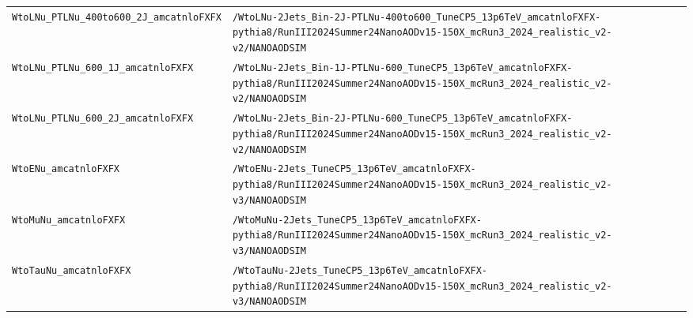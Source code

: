 \begin{longtable}{@{}>{\RaggedRight\arraybackslash}p{} >{\RaggedRight\arraybackslash}p{}@{}}
\addlinespace[2pt]
\texttt{WtoLNu\_\allowbreak{}PTLNu\_\allowbreak{}400to600\_\allowbreak{}2J\_\allowbreak{}amcatnloFXFX} & \texttt{/\allowbreak{}WtoLNu-\allowbreak{}2Jets\_\allowbreak{}Bin-\allowbreak{}2J-\allowbreak{}PTLNu-\allowbreak{}400to600\_\allowbreak{}TuneCP5\_\allowbreak{}13p6TeV\_\allowbreak{}amcatnloFXFX-\allowbreak{}pythia8/\allowbreak{}RunIII2024Summer24NanoAODv15-\allowbreak{}150X\_\allowbreak{}mcRun3\_\allowbreak{}2024\_\allowbreak{}realistic\_\allowbreak{}v2-\allowbreak{}v2/\allowbreak{}NANOAODSIM} \\
\addlinespace[2pt]
\texttt{WtoLNu\_\allowbreak{}PTLNu\_\allowbreak{}600\_\allowbreak{}1J\_\allowbreak{}amcatnloFXFX} & \texttt{/\allowbreak{}WtoLNu-\allowbreak{}2Jets\_\allowbreak{}Bin-\allowbreak{}1J-\allowbreak{}PTLNu-\allowbreak{}600\_\allowbreak{}TuneCP5\_\allowbreak{}13p6TeV\_\allowbreak{}amcatnloFXFX-\allowbreak{}pythia8/\allowbreak{}RunIII2024Summer24NanoAODv15-\allowbreak{}150X\_\allowbreak{}mcRun3\_\allowbreak{}2024\_\allowbreak{}realistic\_\allowbreak{}v2-\allowbreak{}v2/\allowbreak{}NANOAODSIM} \\
\addlinespace[2pt]
\texttt{WtoLNu\_\allowbreak{}PTLNu\_\allowbreak{}600\_\allowbreak{}2J\_\allowbreak{}amcatnloFXFX} & \texttt{/\allowbreak{}WtoLNu-\allowbreak{}2Jets\_\allowbreak{}Bin-\allowbreak{}2J-\allowbreak{}PTLNu-\allowbreak{}600\_\allowbreak{}TuneCP5\_\allowbreak{}13p6TeV\_\allowbreak{}amcatnloFXFX-\allowbreak{}pythia8/\allowbreak{}RunIII2024Summer24NanoAODv15-\allowbreak{}150X\_\allowbreak{}mcRun3\_\allowbreak{}2024\_\allowbreak{}realistic\_\allowbreak{}v2-\allowbreak{}v2/\allowbreak{}NANOAODSIM} \\
\addlinespace[2pt]
\texttt{WtoENu\_\allowbreak{}amcatnloFXFX} & \texttt{/\allowbreak{}WtoENu-\allowbreak{}2Jets\_\allowbreak{}TuneCP5\_\allowbreak{}13p6TeV\_\allowbreak{}amcatnloFXFX-\allowbreak{}pythia8/\allowbreak{}RunIII2024Summer24NanoAODv15-\allowbreak{}150X\_\allowbreak{}mcRun3\_\allowbreak{}2024\_\allowbreak{}realistic\_\allowbreak{}v2-\allowbreak{}v3/\allowbreak{}NANOAODSIM} \\
\addlinespace[2pt]
\texttt{WtoMuNu\_\allowbreak{}amcatnloFXFX} & \texttt{/\allowbreak{}WtoMuNu-\allowbreak{}2Jets\_\allowbreak{}TuneCP5\_\allowbreak{}13p6TeV\_\allowbreak{}amcatnloFXFX-\allowbreak{}pythia8/\allowbreak{}RunIII2024Summer24NanoAODv15-\allowbreak{}150X\_\allowbreak{}mcRun3\_\allowbreak{}2024\_\allowbreak{}realistic\_\allowbreak{}v2-\allowbreak{}v3/\allowbreak{}NANOAODSIM} \\
\addlinespace[2pt]
\texttt{WtoTauNu\_\allowbreak{}amcatnloFXFX} & \texttt{/\allowbreak{}WtoTauNu-\allowbreak{}2Jets\_\allowbreak{}TuneCP5\_\allowbreak{}13p6TeV\_\allowbreak{}amcatnloFXFX-\allowbreak{}pythia8/\allowbreak{}RunIII2024Summer24NanoAODv15-\allowbreak{}150X\_\allowbreak{}mcRun3\_\allowbreak{}2024\_\allowbreak{}realistic\_\allowbreak{}v2-\allowbreak{}v3/\allowbreak{}NANOAODSIM} \\

\end{longtable}
